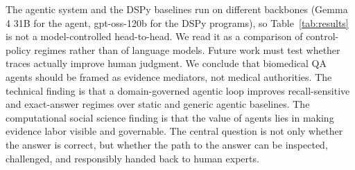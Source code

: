 \documentclass[sigconf,anonymous,review]{acmart}
\begin{document}
The agentic system and the DSPy baselines run on different
backbones (Gemma 4 31B for the agent, gpt-oss-120b for the DSPy programs), so Table~\ref{tab:results} is not a model-controlled head-to-head. We read
it as a comparison of control-policy regimes rather than of language
models. Future work must test whether traces actually improve
human judgment. We conclude that biomedical QA agents should
be framed as evidence mediators, not medical authorities. The
technical finding is that a domain-governed agentic loop improves
recall-sensitive and exact-answer regimes over static and generic
agentic baselines. The computational social science finding is that
the value of agents lies in making evidence labor visible and governable. The central question is not only whether the answer is correct,
but whether the path to the answer can be inspected, challenged,
and responsibly handed back to human experts.
\end{document}
